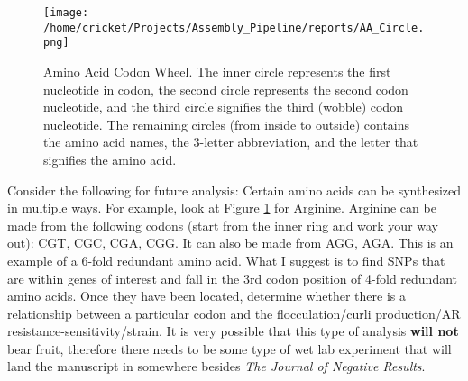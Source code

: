 \documentclass[11pt]{article}
\begin{document}
\begin{figure}[h!]\normalsize %
\centering
\texttt{[image: /home/cricket/Projects/Assembly\_Pipeline/reports/AA\_Circle.png]}
\caption{Amino Acid Codon Wheel. The inner circle represents the first nucleotide in codon, the second circle represents the second codon nucleotide, and the third circle signifies the third (wobble) codon nucleotide. The remaining circles (from inside to outside) contains the amino acid names, the 3-letter abbreviation, and the letter that signifies the amino acid.}
\label{AA}
\end{figure}

Consider the following for future analysis: Certain amino acids can be synthesized in multiple ways. For example, look at Figure \ref{AA} for Arginine. Arginine can be made from the following codons (start from the inner ring and work your way out): CGT, CGC, CGA, CGG. It can also be made from AGG, AGA. This is an example of a 6-fold redundant amino acid. What I suggest is to find SNPs that are within genes of interest and fall in the 3rd codon position of 4-fold redundant amino acids. Once they have been located, determine whether there is a relationship between a particular codon and the flocculation/curli production/AR resistance-sensitivity/strain. It is very possible that this type of analysis \textbf{will not} bear fruit, therefore there needs to be some type of wet lab experiment that will land the manuscript in somewhere besides \textit{The Journal of Negative Results}.



\end{document}
